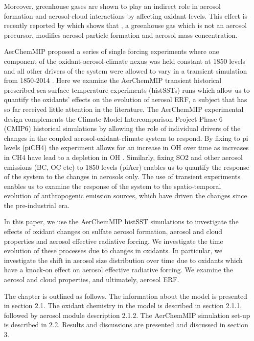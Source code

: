Moreover, greenhouse gases are shown to play an indirect role in aerosol formation and aerosol-cloud interactions by affecting oxidant levels. This effect is recently reported by \citet{oconnorApportionmentPreIndustrial2022} which shows that , a greenhouse gas which is not an aerosol precursor, modifies aerosol particle formation and aerosol mass concentration.  %


AerChemMIP proposed a series of single forcing experiments where one component of the oxidant-aerosol-climate nexus was held constant at 1850 levels and all other drivers of the system were allowed to vary in a transient simulation from 1850-2014 \citep{collinsAerChemMIPQuantifyingEffects2017}. Here we examine the AerChemMIP transient historical prescribed sea-surface temperature experiments (histSSTs) runs which allow us to quantify the oxidants' effects on the evolution of aerosol ERF, a subject that has so far received little attention in the literature. The AerChemMIP experimental design complements the Climate Model Intercomparison Project Phase 6 (CMIP6) historical simulations by allowing the role of individual drivers of the changes in the coupled aerosol-oxidant-climate system to respond. By fixing  to pi levels (piCH4) the experiment allows for an increase in OH over time as increases in CH4 have lead to a depletion in OH \citep{zhaoRoleTrendVariability2020}. Similarly, fixing SO2 and other aerosol emissions (BC, OC etc) to 1850 levels (piAer) enables us to quantify the response of the system to the changes in aerosols only. The use of transient experiments enables us to examine the response of the system to the spatio-temporal evolution of anthropogenic emission sources, which have driven the changes since the pre-industrial era. 


In this paper, we use the AerChemMIP histSST simulations to investigate the effects of oxidant changes on sulfate aerosol formation, aerosol and cloud properties and aerosol effective radiative forcing. We investigate the time evolution of these processes due to changes in oxidants. In particular, we investigate the shift in aerosol size distribution over time due to oxidants which have a knock-on effect on aerosol effective radiative forcing. We examine the aerosol and cloud properties, and ultimately, aerosol ERF. 


The chapter is outlined as follows. The information about the model is presented in section 2.1. The oxidant chemistry in the model is described in section 2.1.1, followed by aerosol module description 2.1.2. The AerChemMIP simulation set-up is described in 2.2. Results and discussions are presented and discussed in section 3.

